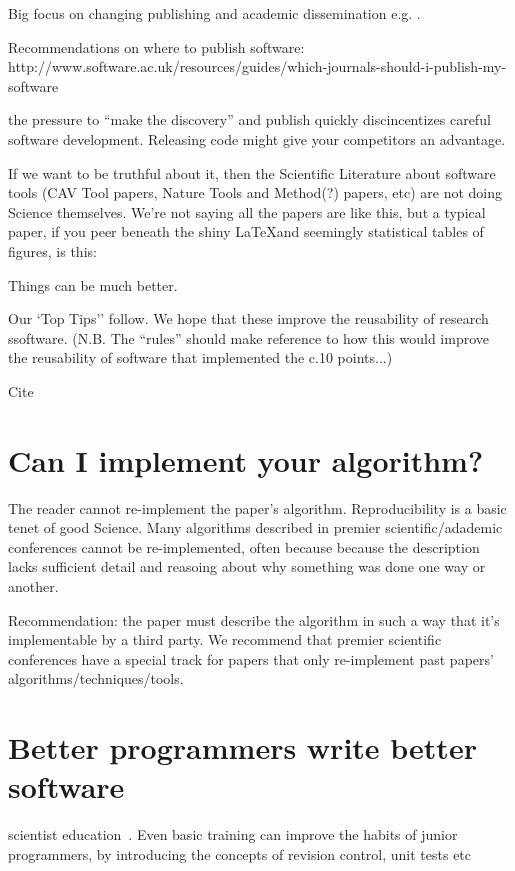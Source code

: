 \documentclass[conference]{IEEEtran}
\begin{document}
Big focus on changing publishing and academic dissemination
e.g. \cite{stodden-et-al:2013}.

Recommendations on where to publish software:
http://www.software.ac.uk/resources/guides/which-journals-should-i-publish-my-software


the pressure to ``make the discovery'' and publish quickly discincentizes careful software development.
Releasing code might give your competitors an advantage. 

If we want to be truthful about it, then the Scientific Literature
about software tools (CAV Tool papers, Nature Tools and Method(?)
papers, etc) are not doing Science themselves. We're not saying all
the papers are like this, but a typical paper, if you peer beneath the
shiny \LaTeX and seemingly statistical tables of figures, is this:

Things can be much better. 



Our `Top Tips'' follow. We hope that these improve the reusability of research ssoftware. 
(N.B. The ``rules'' should
make reference to how this would improve the reusability of software
that implemented the c.10 points...)

Cite~\cite{collberg-et-al:2014}


\section{Can I implement your algorithm?}
The reader cannot re-implement the paper's algorithm. Reproducibility
is a basic tenet of good Science. Many algorithms described in premier
scientific/adademic conferences cannot be re-implemented, often
because because the description lacks sufficient detail and reasoing
about why something was done one way or another.

Recommendation: the paper must describe the algorithm in such a way
that it's implementable by a third party. We recommend that premier
scientific conferences have a special track for papers that only
re-implement past papers' algorithms/techniques/tools.


\section{Better programmers write better software}

scientist education~\cite{Wilson2014}. Even basic training can improve
the habits of junior programmers, by introducing the concepts of
revision control, unit tests etc
\end{document}
